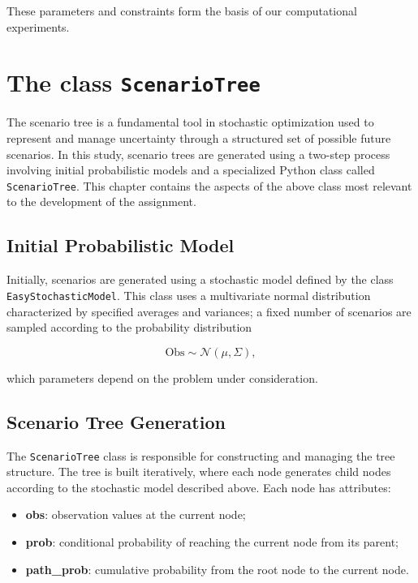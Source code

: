 \documentclass[a4paper,12pt]{article}
\begin{document}
	\noindent These parameters and constraints form the basis of our computational experiments. 
	\newpage
	\section{The class \texttt{ScenarioTree}}
	
	The scenario tree is a fundamental tool in stochastic optimization used to represent and manage uncertainty through a structured set of possible future scenarios. In this study, scenario trees are generated using a two-step process involving initial probabilistic models and a specialized Python class called \texttt{ScenarioTree}. This chapter contains the aspects of the above class most relevant to the development of the assignment.
	
	\subsection{Initial Probabilistic Model}
	
	Initially, scenarios are generated using a stochastic model defined by the class \texttt{EasyStochasticModel}. This class uses a multivariate normal distribution characterized by specified averages and variances; a fixed number of scenarios are sampled according to the probability distribution
	
	\[
	\text{Obs} \sim \mathcal{N}(\mu, \Sigma),
	\]
	
	which parameters depend on the problem under consideration.	
			
	\subsection{Scenario Tree Generation}
	
	The \texttt{ScenarioTree} class is responsible for constructing and managing the tree structure. The tree is built iteratively, where each node generates child nodes according to the stochastic model described above. Each node has attributes:
	
	\begin{itemize}
		\item \textbf{obs}: observation values at the current node;
		\item \textbf{prob}: conditional probability of reaching the current node from its parent;
		\item \textbf{path\_prob}: cumulative probability from the root node to the current node.
	\end{itemize}
	
\end{document}
